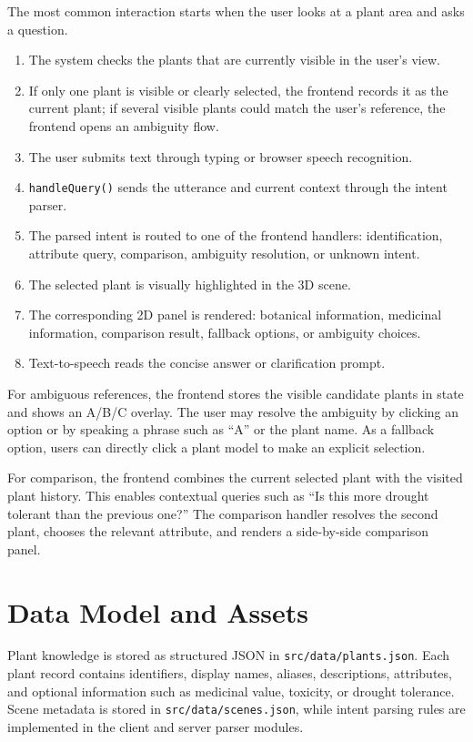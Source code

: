 \documentclass[12pt,a4paper]{article}
\begin{document}
The most common interaction starts when the user looks at a plant area and asks
a question.

\begin{enumerate}[label=\arabic*.]
    \item The system checks the plants that are currently visible in the user's
    view.
    \item If only one plant is visible or clearly selected, the frontend records
    it as the current plant; if several visible plants could match the user's
    reference, the frontend opens an ambiguity flow.
    \item The user submits text through typing or browser speech recognition.
    \item \texttt{handleQuery()} sends the utterance and current context through
    the intent parser.
    \item The parsed intent is routed to one of the frontend handlers:
    identification, attribute query, comparison, ambiguity resolution, or
    unknown intent.
    \item The selected plant is visually highlighted in the 3D scene.
    \item The corresponding 2D panel is rendered: botanical information,
    medicinal information, comparison result, fallback options, or ambiguity
    choices.
    \item Text-to-speech reads the concise answer or clarification prompt.
\end{enumerate}

For ambiguous references, the frontend stores the visible candidate plants in
state and shows an A/B/C overlay. The user may resolve the ambiguity by clicking
an option or by speaking a phrase such as ``A'' or the plant name. As a fallback
option, users can directly click a plant model to make an explicit selection.

For comparison, the frontend combines the current selected plant with the
visited plant history. This enables contextual queries such as ``Is this more
drought tolerant than the previous one?'' The comparison handler resolves the
second plant, chooses the relevant attribute, and renders a side-by-side
comparison panel.

\section{Data Model and Assets}

Plant knowledge is stored as structured JSON in \texttt{src/data/plants.json}.
Each plant record contains identifiers, display names, aliases, descriptions,
attributes, and optional information such as medicinal value, toxicity, or
drought tolerance. Scene metadata is stored in \texttt{src/data/scenes.json},
while intent parsing rules are implemented in the client and server parser
modules.
\end{document}
